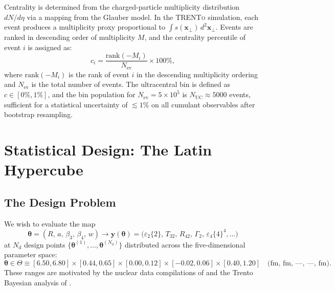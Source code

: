 \documentclass[12pt,a4paper,twoside]{report}
\newcommand{\trento}{\textsc{TRENTo}\xspace}
\begin{document}
Centrality is determined from the charged-particle multiplicity
distribution $dN/d\eta$ via a mapping from the Glauber model.
In the \trento simulation, each event produces a multiplicity proxy
proportional to $\int s(\bm{x}_\perp)\,d^2\bm{x}_\perp$.  Events are
ranked in descending order of multiplicity $M$, and the centrality
percentile of event $i$ is assigned as:
\begin{equation}
  c_i = \frac{\mathrm{rank}(-M_i)}{N_\mathrm{ev}} \times 100\%,
  \label{eq:centrality}
\end{equation}
where $\mathrm{rank}(-M_i)$ is the rank of event $i$ in the
descending multiplicity ordering and $N_\mathrm{ev}$ is the total
number of events.  The ultracentral bin is defined as
$c \in [0\%, 1\%]$, and the bin population for $N_\mathrm{ev} = 5 \times 10^5$
is $N_\mathrm{UC} \approx 5000$ events, sufficient for a statistical
uncertainty of $\lesssim 1\%$ on all cumulant observables after
bootstrap resampling.

\section{Statistical Design: The Latin Hypercube}
\label{sec:lhs}

\subsection{The Design Problem}
\label{subsec:design_problem}

We wish to evaluate the map
\begin{equation}
  \bm{\theta} = (R,\, a,\, \beta_3,\, \beta_4,\, w)
  \longrightarrow
  \bm{y}(\bm{\theta}) = \bigl(\varepsilon_2\{2\},\,
    T_{32},\, R_{42},\, \Gamma_2,\, \varepsilon_4\{4\}^4, \ldots\bigr)
  \label{eq:parameter_to_observable_map}
\end{equation}
at $N_\mathrm{d}$ design points $\{\bm{\theta}^{(1)},
\ldots, \bm{\theta}^{(N_\mathrm{d})}\}$ distributed across the
five-dimensional parameter space:
\begin{equation}
  \bm{\theta} \in \Theta \equiv [6.50, 6.80]
    \times [0.44, 0.65]
    \times [0.00, 0.12]
    \times [-0.02, 0.06]
    \times [0.40, 1.20]
    \quad \text{(fm, fm, —, —, fm)}.
  \label{eq:prior_box}
\end{equation}
These ranges are motivated by the nuclear data compilations of
\cite{deVries1987,Carzon2020,Bally2022} and the Trento Bayesian
analysis of \cite{Bernhard2019}.
\end{document}
